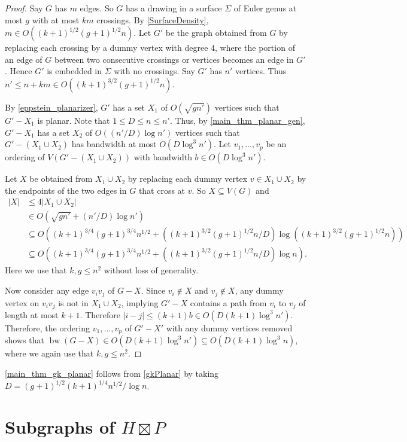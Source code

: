 \documentclass{patmorin}
\renewcommand{\le}{\leqslant}
\renewcommand{\leq}{\leqslant}
\DeclareMathOperator{\bw}{bw}
\begin{document}
\begin{proof}
Say $G$ has $m$ edges. So $G$ has a drawing in a surface $\Sigma$ of Euler genus at most $g$ with at most $km$ crossings. By \cref{SurfaceDensity}, $m\in O((k+1)^{1/2}(g+1)^{1/2}n)$. Let $G'$ be the graph obtained from $G$ by replacing each crossing by a dummy vertex with degree 4, where the portion of an edge of $G$ between two consecutive crossings or vertices becomes an edge in $G'$. Hence $G'$ is embedded in $\Sigma$ with no crossings. Say $G'$ has $n'$ vertices. Thus $n'\leq n+km \in O((k+1)^{3/2}(g+1)^{1/2}n)$.

By \cref{eppstein_planarizer}, $G'$ has a set $X_1$ of $O(\sqrt{gn'})$ vertices such that $G'-X_1$ is planar.
Note that $1\leq D\leq n\leq n'$. Thus, by \cref{main_thm_planar_gen}, $G'-X_1$ has a set $X_2$ of $O((n'/D)\log n')$ vertices such that $G'-(X_1\cup X_2)$ has bandwidth at most $O(D\log^3 n')$. Let $v_1,\ldots,v_p$  be an ordering of $V(G'-(X_1\cup X_2))$ with bandwidth
$b\in O(D\log^3 n')$.

Let $X$ be obtained from $X_1\cup X_2$ by replacing each dummy vertex $v\in X_1\cup X_2$ by the endpoints of the two edges in $G$ that cross at $v$. So $X\subseteq V(G)$ and
\begin{align*}
|X|&  \leq  4|X_1\cup X_2| \\
&  \in O(\sqrt{gn'} + (n'/D)\log n')\\
& \subseteq O((k+1)^{3/4}(g+1)^{3/4}n^{1/2} + ((k+1)^{3/2}(g+1)^{1/2}n/D)
\log ((k+1)^{3/2}(g+1)^{1/2}n))\\
& \subseteq O((k+1)^{3/4}(g+1)^{3/4}n^{1/2} + ((k+1)^{3/2}(g+1)^{1/2}n/D)\log n) .
\end{align*}
Here we use that $k,g\leq n^2$ without loss of generality.

Now consider any edge $v_i v_j$ of $G-X$. Since $v_i\not\in X$ and $v_j\not\in X$, any dummy vertex on $v_iv_j$ is not in $X_1\cup X_2$, implying $G'-X$ contains a path from $v_i$ to $v_j$ of length at most $k+1$.  Therefore $|i-j|\le (k+1)b\in  O(D(k+1)\log^3 n')$.
Therefore, the ordering $v_1,\dots,v_p$ of $G'-X'$ with any dummy vertices removed shows that
$\bw(G-X)\in O(D(k+1)\log^3 n')
\subseteq O(D(k+1)\log^3 n)$, where we again use that $k,g\leq n^2$.
\end{proof}

\cref{main_thm_gk_planar} follows from \cref{gkPlanar} by taking $D=(g+1)^{1/2}(k+1)^{1/4}n^{1/2}/\log n$.

\section{\boldmath Subgraphs of $H\boxtimes P$}
\label{htimesp_section}
\end{document}
